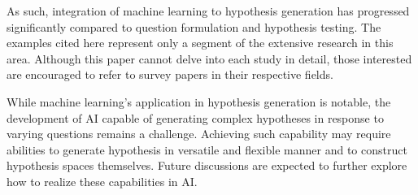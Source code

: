 As such, integration of machine learning to hypothesis generation has progressed significantly compared to question formulation and hypothesis testing. The examples cited here represent only a segment of the extensive research in this area. Although this paper cannot delve into each study in detail, those interested are encouraged to refer to survey papers in their respective fields.

While machine learning's application in hypothesis generation is notable, the development of AI capable of generating complex hypotheses in response to varying questions remains a challenge. Achieving such capability may require abilities to generate hypothesis in versatile and flexible manner and to construct hypothesis spaces themselves. Future discussions are expected to further explore how to realize these capabilities in AI.




